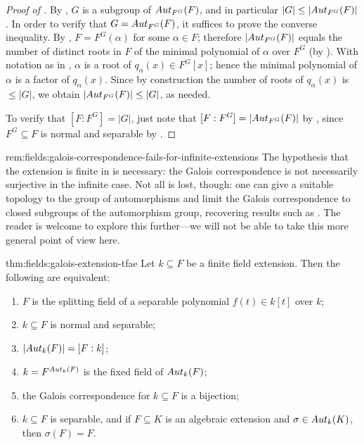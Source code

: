 \begin{proof}[Proof of ]
  By , $G$ is a subgroup of $Aut_{F^G}(F)$, and
  in particular $|G| \leq |Aut_{F^G}(F)|$. In order to verify that
  $G = Aut_{F^G}(F)$, it suffices to prove the converse
  inequality. By , $F = F^G(\alpha)$ for some
  $\alpha \in F$; therefore $|Aut_{F^G}(F)|$ equals the number of
  distinct roots in $F$ of the minimal polynomial of $\alpha$ over
  $F^G$ (by ). With notation as in
  , $\alpha$ is a root of
  $q_\alpha(x) \in F^G[x]$; hence the minimal polynomial of $\alpha$
  is a factor of $q_\alpha(x)$.  Since by construction the number of
  roots of $q_\alpha(x)$ is $\leq |G|$, we obtain
  $|Aut_{F^G}(F)| \leq |G|$, as needed.

  To verify that $[F : F^G] = |G|$, just note that
  $[F : F^G] = |Aut_{F^G}(F)|$ by , since
  $F^G \subseteq F$ is normal and separable by .
\end{proof}
\begin{rem}{}{rem:fields:galois-correspondence-fails-for-infinite-extensions}
  The hypothesis that the extension is finite in
   is necessary: the Galois correspondence is
  not necessarily surjective in the infinite case. Not all is lost,
  though: one can give a suitable topology to the group of
  automorphisms and limit the Galois correspondence to closed
  subgroups of the automorphism group, recovering results such as
  . The reader is welcome to explore this
  further---we will not be able to take this more general point of
  view here.
\end{rem}
\begin{thm}{}{thm:fields:galois-extension-tfae}
  Let $k \subseteq F$ be a finite field extension. Then the following
  are equivalent:
  \begin{enumerate}[label=(\arabic*)]
  \item $F$ is the splitting field of a separable polynomial
    $f(t) \in k[t]$ over $k$;
  \item $k \subseteq F$ is normal and separable;
  \item $|Aut_k(F)| = [F : k]$;
  \item $k = F^{Aut_k(F)}$ is the fixed field of $Aut_k(F)$;
  \item the Galois correspondence for $k \subseteq F$ is a bijection;
  \item $k \subseteq F$ is separable, and if $F \subseteq K$ is an
    algebraic extension and $\sigma \in Aut_k(K)$, then
    $\sigma(F) = F$.
  \end{enumerate}
\end{thm}
